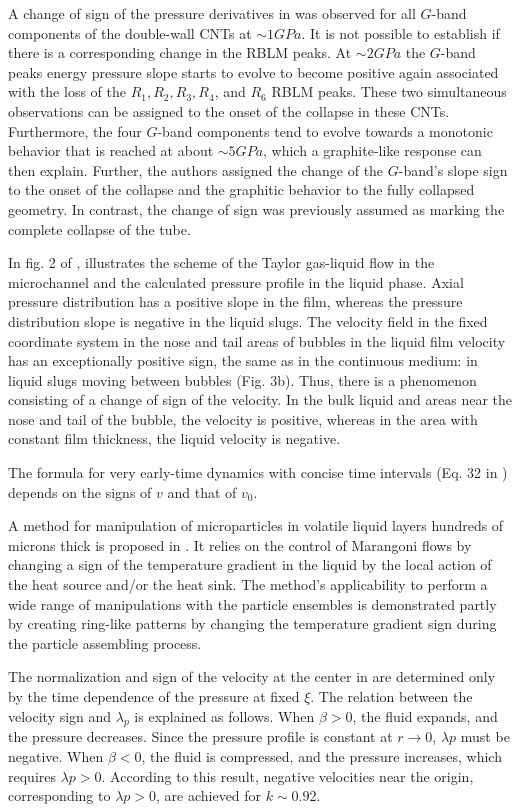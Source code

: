 \documentclass[11pt]{book}
\begin{document}
A change of sign of the pressure derivatives in \cite{alencar2017pressure}
was observed for all $G$-band components of the double-wall CNTs
at $\sim1GPa$. It is not possible to establish if there is a corresponding
change in the RBLM peaks. At $\sim2GPa$ the $G$-band peaks energy
pressure slope starts to evolve to become positive again associated
with the loss of the $R_{1},R_{2},R_{3},R_{4}$, and $R_{6}$ RBLM
peaks. These two simultaneous observations can be assigned to the
onset of the collapse in these CNTs. Furthermore, the four $G$-band
components tend to evolve towards a monotonic behavior that is reached
at about $\sim5GPa$, which a graphite-like response can then explain.
Further, the authors assigned the change of the $G$-band's slope
sign to the onset of the collapse and the graphitic behavior to the
fully collapsed geometry. In contrast, the change of sign was previously
assumed as marking the complete collapse of the tube.

In fig. 2 of \cite{abiev2017analysis}, illustrates the scheme of
the Taylor gas-liquid flow in the microchannel and the calculated
pressure profile in the liquid phase. Axial pressure distribution
has a positive slope in the film, whereas the pressure distribution
slope is negative in the liquid slugs. The velocity field in the fixed
coordinate system in the nose and tail areas of bubbles in the liquid
film velocity has an exceptionally positive sign, the same as in the
continuous medium: in liquid slugs moving between bubbles (Fig. 3b).
Thus, there is a phenomenon consisting of a change of sign of the
velocity. In the bulk liquid and areas near the nose and tail of the
bubble, the velocity is positive, whereas in the area with constant
film thickness, the liquid velocity is negative.

The formula for very early-time dynamics with concise time intervals
(Eq. 32 in \cite{hill2019group}) depends on the signs of $v$ and
that of $v_{0}$.

A method for manipulation of microparticles in volatile liquid layers
hundreds of microns thick is proposed in \cite{al2021transport}.
It relies on the control of Marangoni flows by changing a sign of
the temperature gradient in the liquid by the local action of the
heat source and/or the heat sink. The method's applicability to perform
a wide range of manipulations with the particle ensembles is demonstrated
partly by creating ring-like patterns by changing the temperature
gradient sign during the particle assembling process.

The normalization and sign of the velocity at the center in \cite{faran2021non}
are determined only by the time dependence of the pressure at fixed
$\xi$. The relation between the velocity sign and $\lambda_{p}$
is explained as follows. When $\beta>0$, the fluid expands, and the
pressure decreases. Since the pressure profile is constant at $r\rightarrow0$,
$\lambda p$ must be negative. When $\beta<0$, the fluid is compressed,
and the pressure increases, which requires $\lambda p>0$. According
to this result, negative velocities near the origin, corresponding
to $\lambda p>0$, are achieved for $k\sim0.92$.
\end{document}
